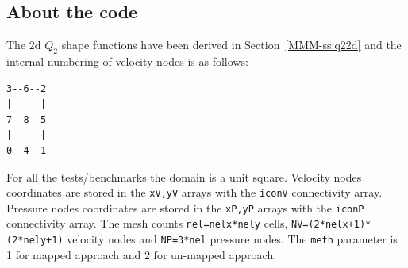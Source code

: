 \subsection*{About the code}


The 2d $Q_2$ shape functions have been derived in Section~\ref{MMM-ss:q22d}
and the internal numbering of velocity nodes is as follows:
\begin{verbatim}
3--6--2
|     |
7  8  5
|     |
0--4--1
\end{verbatim}

For all the tests/benchmarks the domain is a unit square.
Velocity nodes coordinates are stored in the \lstinline{xV,yV} arrays
with the \lstinline{iconV} connectivity array.
Pressure nodes coordinates are stored in the \lstinline{xP,yP} arrays
with the \lstinline{iconP} connectivity array.
The mesh counts \lstinline{nel=nelx*nely} cells,
\lstinline{NV=(2*nelx+1)*(2*nely+1)} velocity nodes and 
\lstinline{NP=3*nel} pressure nodes.
The \lstinline{meth} parameter is 1 for mapped approach and 2 
for un-mapped approach. 

